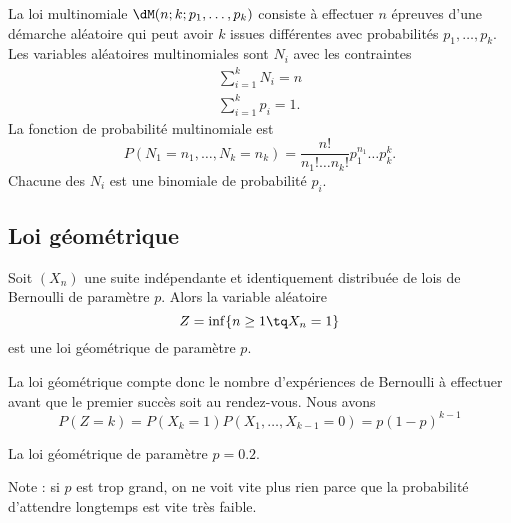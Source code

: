 La loi multinomiale \( \dM(n;k;p_1,\ldots, p_k)\) consiste à effectuer \( n\) épreuves d'une démarche aléatoire qui peut avoir \( k\) issues différentes avec probabilités \( p_1,\ldots, p_k\). Les variables aléatoires multinomiales sont \( N_i\) avec les contraintes
\begin{subequations}
    \begin{align}
        \sum_{i=1}^kN_i=n\\
        \sum_{i=1}^kp_i=1.
    \end{align}
\end{subequations}
La fonction de probabilité multinomiale est
\begin{equation}
    P(N_1=n_1,\ldots, N_k=n_k)=\frac{ n! }{ n_1!\ldots n_k! }p_1^{n_1}\ldots p_k^k.
\end{equation}
Chacune des \( N_i\) est une binomiale de probabilité \( p_i\).

\subsection{Loi géométrique}

Soit \( (X_n)\) une suite indépendante et identiquement distribuée de lois de Bernoulli de paramètre \( p\). Alors la variable aléatoire
\begin{equation}
    Z=\inf\{ n\geq 1\tq X_n=1 \}
\end{equation}
est une loi géométrique de paramètre \( p\).

La loi géométrique compte donc le nombre d'expériences de Bernoulli à effectuer avant que le premier succès soit au rendez-vous. Nous avons
\begin{equation}
    P(Z=k)=P(X_k=1)P(X_1,\ldots,X_{k-1}=0)=p(1-p)^{k-1}
\end{equation}

La loi géométrique de paramètre \( p=0.2\).

\begin{center}
   
\end{center}
Note : si \( p\) est trop grand, on ne voit vite plus rien parce que la probabilité d'attendre longtemps est vite très faible.

